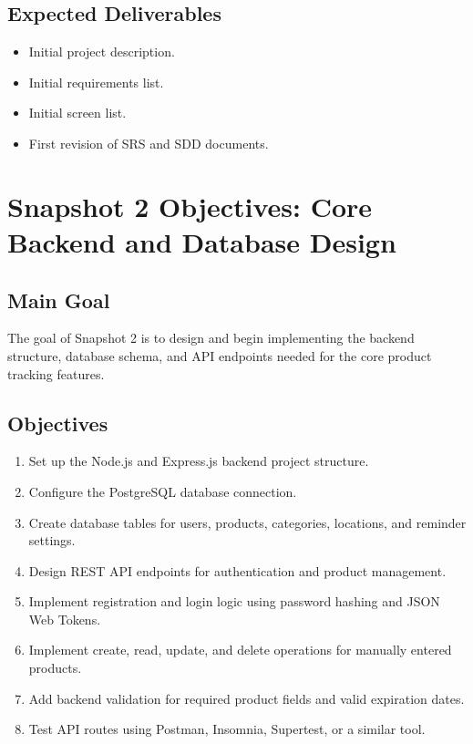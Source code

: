 \documentclass[12pt]{article}
\begin{document}
\subsection{Expected Deliverables}
\begin{itemize}[leftmargin=*]
    \item Initial project description.
    \item Initial requirements list.
    \item Initial screen list.
    \item First revision of SRS and SDD documents.
\end{itemize}

\section{Snapshot 2 Objectives: Core Backend and Database Design}

\subsection{Main Goal}
The goal of Snapshot 2 is to design and begin implementing the backend structure, database schema, and API endpoints needed for the core product tracking features.

\subsection{Objectives}
\begin{enumerate}[leftmargin=*]
    \item Set up the Node.js and Express.js backend project structure.
    \item Configure the PostgreSQL database connection.
    \item Create database tables for users, products, categories, locations, and reminder settings.
    \item Design REST API endpoints for authentication and product management.
    \item Implement registration and login logic using password hashing and JSON Web Tokens.
    \item Implement create, read, update, and delete operations for manually entered products.
    \item Add backend validation for required product fields and valid expiration dates.
    \item Test API routes using Postman, Insomnia, Supertest, or a similar tool.
\end{enumerate}
\end{document}
